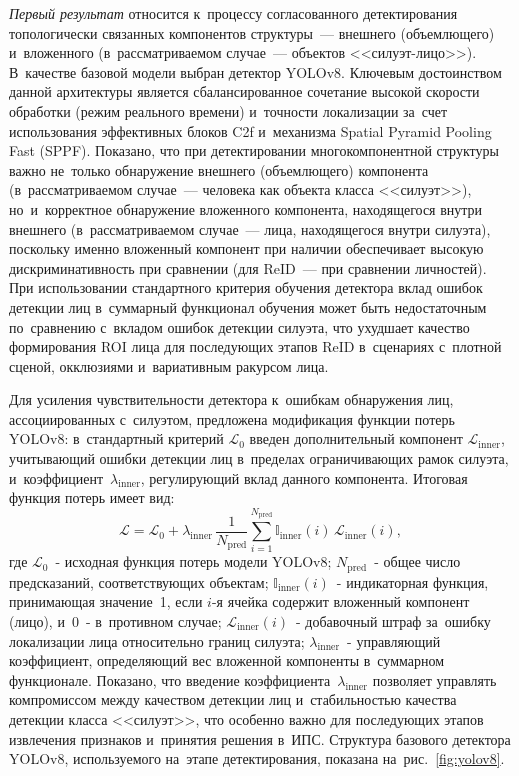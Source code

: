 \textit{Первый результат} относится к~процессу согласованного детектирования
топологически связанных компонентов структуры~--- внешнего (объемлющего)
и~вложенного (в~рассматриваемом случае~--- объектов <<силуэт-лицо>>).
В~качестве базовой модели выбран детектор YOLOv8.
Ключевым достоинством данной архитектуры является сбалансированное сочетание
высокой скорости обработки (режим реального времени) и~точности локализации
за~счет использования эффективных блоков C2f и~механизма Spatial Pyramid
Pooling Fast (SPPF). Показано, что при детектировании многокомпонентной структуры важно
не~только обнаружение внешнего (объемлющего) компонента (в~рассматриваемом
случае~--- человека как объекта класса <<силуэт>>), но~и~корректное
обнаружение вложенного компонента, находящегося внутри внешнего
(в~рассматриваемом случае~--- лица, находящегося внутри силуэта),
поскольку именно вложенный компонент при наличии обеспечивает высокую
дискриминативность при сравнении (для ReID~--- при сравнении личностей). При использовании стандартного критерия обучения детектора
вклад ошибок детекции лиц в~суммарный функционал обучения может быть
недостаточным по~сравнению с~вкладом ошибок детекции силуэта, что ухудшает
качество формирования ROI лица для последующих этапов ReID в~сценариях
с~плотной сценой, окклюзиями и~вариативным ракурсом лица.

Для усиления чувствительности детектора к~ошибкам обнаружения лиц,
ассоциированных с~силуэтом, предложена модификация функции потерь YOLOv8:
в~стандартный критерий $\mathcal{L}_0$ введен дополнительный компонент
$\mathcal{L}_{\text{inner}}$, учитывающий ошибки детекции лиц в~пределах
ограничивающих рамок силуэта, и~коэффициент~$\lambda_{\text{inner}}$,
регулирующий вклад данного компонента. Итоговая функция потерь имеет вид:
\begin{equation}
    \mathcal{L}=\mathcal{L}_0+\lambda_{\text{inner}}\,
    \frac{1}{N_{\text{pred}}}\sum_{i=1}^{N_{\text{pred}}}\mathbb{I}_{\text{inner}}(i)\,
    \mathcal{L}_{\text{inner}}(i),
    \label{eq:loss}
\end{equation}
где $\mathcal{L}_0$~- исходная функция потерь модели YOLOv8;
$N_{\text{pred}}$~- общее число предсказаний, соответствующих объектам;
$\mathbb{I}_{\text{inner}}(i)$~- индикаторная функция, принимающая значение~1,
если $i$-я ячейка содержит вложенный компонент (лицо), и~0~- в~противном
случае; $\mathcal{L}_{\text{inner}}(i)$~- добавочный штраф за~ошибку
локализации лица относительно границ силуэта;
$\lambda_{\text{inner}}$~- управляющий коэффициент, определяющий вес
вложенной компоненты в~суммарном функционале. Показано, что введение
коэффициента~$\lambda_{\text{inner}}$ позволяет управлять компромиссом между
качеством детекции лиц и~стабильностью качества детекции класса <<силуэт>>,
что особенно важно для последующих этапов извлечения признаков и~принятия
решения в~ИПС. Структура базового детектора YOLOv8, используемого
на~этапе детектирования, показана на~рис.~\ref{fig:yolov8}.

